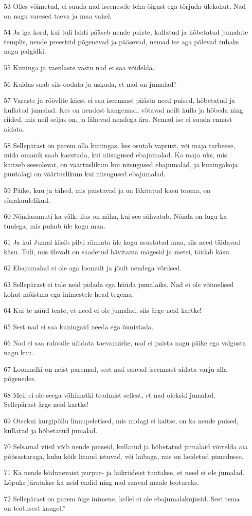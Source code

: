 \par 53 Olles võimetud, ei suuda nad iseenesele teha õigust ega tõrjuda  ülekohut. Nad on nagu varesed taeva ja maa vahel.
\par 54 Ja iga kord, kui tuli lahti pääseb nende puiste, kullatud ja  hõbetatud jumalate templis, nende preestrid põgenevad ja pääsevad,  nemad ise aga põlevad tuhaks nagu palgidki.
\par 55 Kuninga ja vaenlaste vastu nad ei saa võidelda.
\par 56 Kuidas saab siis oodata ja uskuda, et nad on jumalad?
\par 57 Varaste ja röövlite käest ei saa iseennast päästa need puised,  hõbetatud ja kullatud jumalad. Kes on nendest kangemad, võtavad neilt  kulla ja hõbeda ning riided, mis neil seljas on, ja lähevad nendega  ära. Nemad ise ei suuda ennast aidata.
\par 58 Sellepärast on parem olla kuningas, kes osutab vaprust, või maja  tarbeese, mida omanik saab kasutada, kui niisugused ebajumalad. Ka  maja uks, mis kaitseb seesolevat, on väärtuslikum kui niisugused  ebajumalad, ja kuningakoja puutalagi on väärtuslikum kui niisugused  ebajumalad.
\par 59 Päike, kuu ja tähed, mis paistavad ja on läkitatud kasu tooma,  on sõnakuulelikud.
\par 60 Nõndasamuti ka välk: ilus on näha, kui see sähvatab. Nõnda on  lugu ka tuulega, mis puhub üle kogu maa.
\par 61 Ja kui Jumal käsib pilvi rännata üle kogu asustatud maa, siis  need täidavad käsu. Tuli, mis ülevalt on saadetud hävitama mägesid ja  metsi, täidab käsu.
\par 62 Ebajumalad ei ole aga loomult ja jõult nendega võrdsed.
\par 63 Sellepärast ei tule neid pidada ega hüüda jumalaiks. Nad ei ole  võimelised kohut mõistma ega inimestele head tegema.
\par 64 Kui te nüüd teate, et need ei ole jumalad, siis ärge neid  kartke!
\par 65 Sest nad ei saa kuningaid needa ega õnnistada.
\par 66 Nad ei saa rahvaile näidata taevamärke, nad ei paista nagu päike  ega valgusta nagu kuu.
\par 67 Loomadki on neist paremad, sest nad saavad iseennast aidata  varju alla põgenedes.
\par 68 Meil ei ole seega vähimatki teadmist sellest, et nad oleksid  jumalad. Sellepärast ärge neid kartke!
\par 69 Otsekui kurgipõllu linnupeletised, mis midagi ei kaitse, on ka  nende puised, kullatud ja hõbetatud jumalad.
\par 70 Selsamal viisil võib nende puiseid, kullatud ja hõbetatud  jumalaid võrrelda aia põõsastaraga, kuhu kõik linnud istuvad, või  laibaga, mis on heidetud pimedusse.
\par 71 Ka nende kõdunevaist purpur- ja läikriideist tuntakse, et need  ei ole jumalad. Lõpuks järatakse ka neid endid ning nad saavad  maale teotuseks.
\par 72 Sellepärast on parem õige inimene, kellel ei ole  ebajumalakujusid. Sest tema on teotusest kaugel.”

